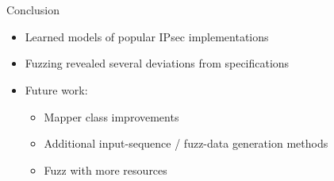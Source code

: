 \documentclass[aspectratio=169, xcolor=table]{beamer}
\begin{document}
\section*{}

\begin{frame}{Conclusion}
	\vspace{-1.5em}
	\begin{itemize}
		\item Learned models of popular IPsec implementations
		\item Fuzzing revealed several deviations from specifications
		\item Future work:
		\pause
		\begin{itemize}
			\item Mapper class improvements
			\item Additional input-sequence / fuzz-data generation methods
			\item Fuzz with more resources
		\end{itemize}
	\end{itemize}
\end{frame}
\end{document}
